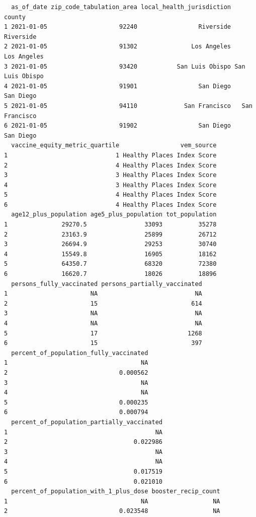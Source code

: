 \documentclass[
  letterpaper,
  DIV=11,
  numbers=noendperiod]{scrartcl}
\begin{document}
\begin{verbatim}
  as_of_date zip_code_tabulation_area local_health_jurisdiction          county
1 2021-01-05                    92240                 Riverside       Riverside
2 2021-01-05                    91302               Los Angeles     Los Angeles
3 2021-01-05                    93420           San Luis Obispo San Luis Obispo
4 2021-01-05                    91901                 San Diego       San Diego
5 2021-01-05                    94110             San Francisco   San Francisco
6 2021-01-05                    91902                 San Diego       San Diego
  vaccine_equity_metric_quartile                 vem_source
1                              1 Healthy Places Index Score
2                              4 Healthy Places Index Score
3                              3 Healthy Places Index Score
4                              3 Healthy Places Index Score
5                              4 Healthy Places Index Score
6                              4 Healthy Places Index Score
  age12_plus_population age5_plus_population tot_population
1               29270.5                33093          35278
2               23163.9                25899          26712
3               26694.9                29253          30740
4               15549.8                16905          18162
5               64350.7                68320          72380
6               16620.7                18026          18896
  persons_fully_vaccinated persons_partially_vaccinated
1                       NA                           NA
2                       15                          614
3                       NA                           NA
4                       NA                           NA
5                       17                         1268
6                       15                          397
  percent_of_population_fully_vaccinated
1                                     NA
2                               0.000562
3                                     NA
4                                     NA
5                               0.000235
6                               0.000794
  percent_of_population_partially_vaccinated
1                                         NA
2                                   0.022986
3                                         NA
4                                         NA
5                                   0.017519
6                                   0.021010
  percent_of_population_with_1_plus_dose booster_recip_count
1                                     NA                  NA
2                               0.023548                  NA

\end{verbatim}
\end{document}
